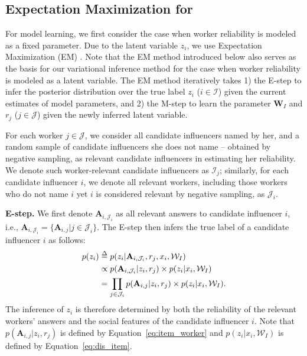 \subsection{Expectation Maximization for \sys} 
\label{sec:em}
For model learning, we first consider the case when worker reliability is modeled as a fixed parameter. Due to the latent variable $z_i$, we use Expectation Maximization (EM) \cite{dempster1977maximum}. Note that the EM method introduced below also serves as the basis for our variational inference method for the case when worker reliability is modeled as a latent variable. The EM method iteratively takes 1) the E-step to infer the posterior distribution over the true label $z_i$ ($i\in \mathcal{I}$) given the current estimates of model parameters, and 2) the M-step to learn the parameter $\mathbf{W}_I$ and $r_j$ ($j\in \mathcal{J}$) given the newly inferred latent variable.

For each worker $j\in \mathcal{J}$, we consider all candidate influencers named by her, and a random sample of candidate influencers she does not name -- obtained by negative sampling, as relevant candidate influencers in estimating her reliability. We denote such worker-relevant candidate influencers as $\mathcal{I}_j$; similarly, for each candidate influencer $i$, we denote all relevant workers, including those workers who do not name $i$ yet $i$  is considered relevant by negative sampling, as $\mathcal{J}_i$.

\smallskip
\noindent\textbf{E-step.} We first denote $\mathbf{A}_{i,\mathcal{J}_i}$ as all relevant answers to candidate influencer $i$, i.e., $\mathbf{A}_{i,\mathcal{J}_i} = \{\mathbf{A}_{i,j}|j \in \mathcal{J}_i\}$. The E-step then infers the true label of a candidate influencer $i$ as follows:
%
\begin{align}
    p(z_i) & \delequal p(z_i|\mathbf{A}_{i,\mathcal{J}_i},r_{j},x_i,\mathcal{W}_I) \nonumber\\
        &\propto p(\mathbf{A}_{i,\mathcal{J}_i}|z_i,r_j)\times p(z_i|x_i,\mathcal{W}_I) \label{eq:dist_cond}\\
        &=\prod_{j \in \mathcal{J}_i} p(\mathbf{A}_{i,j}|z_i,r_{j})\times p(z_i|x_i,\mathcal{W}_I). \nonumber    
\end{align}
%
The inference of $z_i$ is therefore determined by both the reliability of the relevant workers' answers and the social features of the candidate influencer $i$. Note that $p(\mathbf{A}_{i,j}|z_i,r_{j})$ is defined by Equation~\ref{eq:item_worker} and $p(z_i|x_i,\mathcal{W}_I)$ is defined by Equation~\ref{eq:dis_item}.

